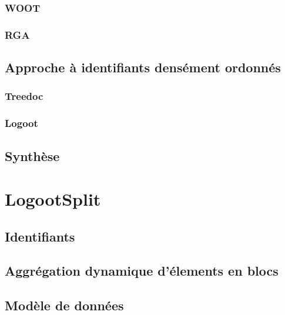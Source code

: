 \documentclass[12pt]{thesul}
\begin{document}
\subsubsection{WOOT}


\subsubsection{\acl{RGA}}


\subsection{Approche à identifiants densément ordonnés}

\subsubsection{Treedoc}


\subsubsection{Logoot}



\subsection{Synthèse}


\section{LogootSplit}


\subsection{Identifiants}


\subsection{Aggrégation dynamique d'élements en blocs}


\subsection{Modèle de données}

\end{document}
